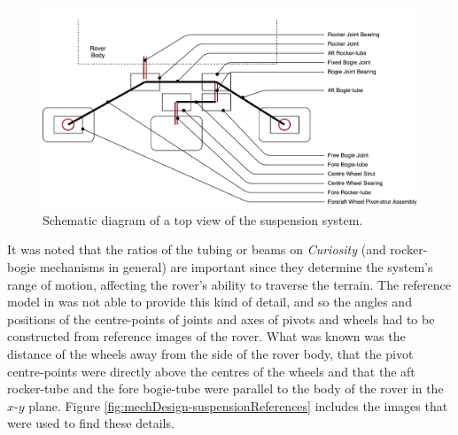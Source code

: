       \begin{figure}[h!]
        \centering
        \includegraphics[width=1\linewidth]{figures/mechDesign-suspensionLinkageMap}
        \caption[Schematic diagram of a top view of the suspension system.]{Schematic diagram of a top view of the suspension system.}
        \label{fig:mechdesign-suspensionLinkageMap}
      \end{figure}
      
      It was noted that the ratios of the tubing or beams on \textit{Curiosity} (and rocker-bogie mechanisms in general) are important since they determine the system's range of motion, affecting the rover's ability to traverse the terrain. The reference model in \cite{nasa3Dprint} was not able to provide this kind of detail, and so the angles and positions of the centre-points of joints and axes of pivots and wheels had to be constructed from reference images of the rover. What was known was the distance of the wheels away from the side of the rover body, that the pivot centre-points were directly above the centres of the wheels and that the aft rocker-tube and the fore bogie-tube were parallel to the body of the rover in the $x$-$y$ plane. Figure \ref{fig:mechDesign-suspensionReferences} includes the images that were used to find these details.
      
